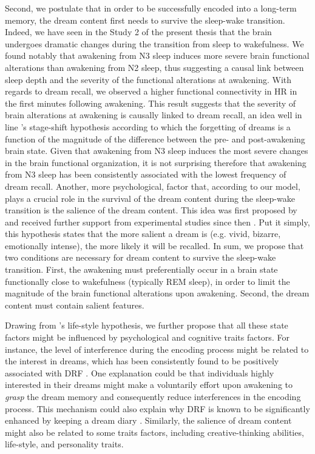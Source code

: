 Second, we postulate that in order to be successfully encoded into a long-term memory, the dream content first needs to survive the sleep-wake transition. Indeed, we have seen in the Study 2 of the present thesis that the brain undergoes dramatic changes during the transition from sleep to wakefulness. We found notably that awakening from N3 sleep induces more severe brain functional alterations than awakening from N2 sleep, thus suggesting a causal link between sleep depth and the severity of the functional alterations at awakening. With regards to dream recall, we observed a higher functional connectivity in HR in the first minutes following awakening. This result suggests that the severity of brain alterations at awakening is causally linked to dream recall, an idea well in line \citet{koukkou_dreaming:_1983}'s stage-shift hypothesis according to which the forgetting of dreams is a function of the magnitude of the difference between the pre- and post-awakening brain state. Given that awakening from N3 sleep induces the most severe changes in the brain functional organization, it is not surprising therefore that awakening from N3 sleep has been consistently associated with the lowest frequency of dream recall. Another, more psychological, factor that, according to our model, plays a crucial role in the survival of the dream content during the sleep-wake transition is the salience of the dream content. This idea was first proposed by \citet{cohen_test_1974} and received further support from experimental studies since then \citep{cipolli_bizarreness_1993, schredl_emotions_1998}. Put it simply, this hypothesis states that the more salient a dream is (e.g. vivid, bizarre, emotionally intense), the more likely it will be recalled. In sum, we propose that two conditions are necessary for dream content to survive the sleep-wake transition. First, the awakening must preferentially occur in a brain state functionally close to wakefulness (typically REM sleep), in order to limit the magnitude of the brain functional alterations upon awakening. Second, the dream content must contain salient features.

Drawing from \citet{schonbar_differential_1965}'s life-style hypothesis, we further propose that all these state factors might be influenced by psychological and cognitive traits factors. For instance, the level of interference during the encoding process might be related to the interest in dreams, which has been consistently found to be positively associated with DRF \citep{schredl_factors_2003}. One explanation could be that individuals highly interested in their dreams might make a voluntarily effort upon awakening to \emph{grasp} the dream memory and consequently reduce interferences in the encoding process. This mechanism could also explain why DRF is known to be significantly enhanced by keeping a dream diary \citep{schredl_questionnaires_2002}. Similarly, the salience of dream content might also be related to some traits factors, including creative-thinking abilities, life-style, and personality traits.

